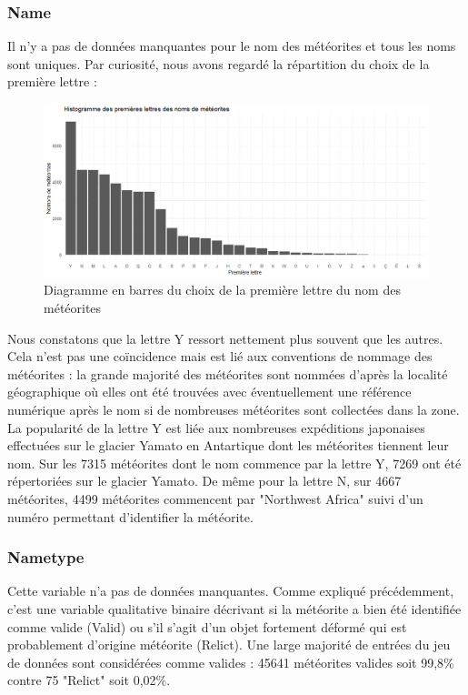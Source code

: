 \documentclass[12pt]{article}
\begin{document}
\subsubsection*{Name}
Il n'y a pas de données manquantes pour le nom des météorites et tous les noms sont uniques. Par curiosité, nous avons regardé la répartition du choix de la première lettre :
\begin{figure}[H]
\centering
\includegraphics[width=16cm]{Images/exploration/name_barplot_lettres.png}
\caption{Diagramme en barres du choix de la première lettre du nom des météorites}
\end{figure}
Nous constatons que la lettre Y ressort nettement plus souvent que les autres. Cela n'est pas une coïncidence mais est lié aux conventions de nommage des météorites \cite{Convention_nommage_meteorites} : la grande majorité des météorites sont nommées d'après la localité géographique où elles ont été trouvées avec éventuellement une référence numérique après le nom si de nombreuses météorites sont collectées dans la zone. La popularité de la lettre Y est liée aux nombreuses expéditions japonaises effectuées sur le glacier Yamato en Antartique dont les météorites tiennent leur nom. Sur les 7315 météorites dont le nom commence par la lettre Y, 7269 ont été répertoriées sur le glacier Yamato. De même pour la lettre N, sur 4667 météorites, 4499 météorites commencent par "Northwest Africa" suivi d'un numéro permettant d'identifier la météorite.
\subsubsection*{Nametype}
Cette variable n'a pas de données manquantes. Comme expliqué précédemment, c'est une variable qualitative binaire décrivant si la météorite a bien été identifiée comme valide (Valid) ou s'il s'agit d'un objet fortement déformé qui est probablement d'origine météorite (Relict). Une large majorité de entrées du jeu de données sont considérées comme valides : 45641 météorites valides soit 99,8\% contre 75 "Relict" soit 0,02\%.
\end{document}
